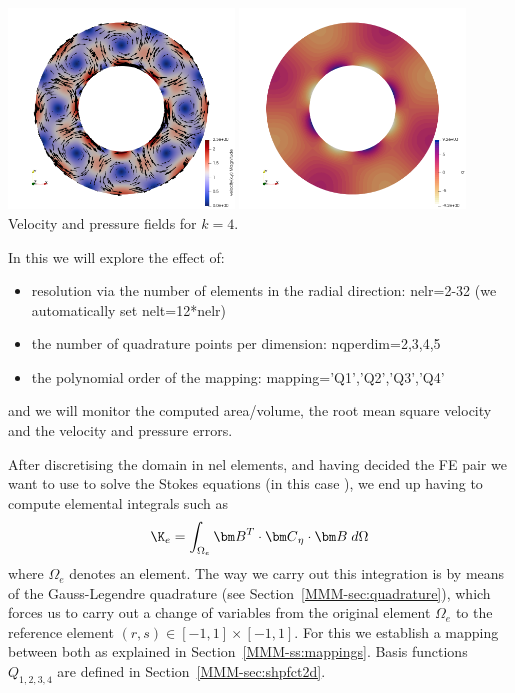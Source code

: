 \begin{center}
\includegraphics[width=6cm]{python_codes/fieldstone_152/images/vel}
\includegraphics[width=6cm]{python_codes/fieldstone_152/images/press}\\
{\captionfont Velocity and pressure fields for $k=4$.}
\end{center}

\noindent In this \stone we will explore the effect of:
\begin{itemize}
\item resolution via the number of elements in the radial direction: {\python nelr=2-32} (we automatically set {\python nelt=12*nelr})
\item the number of quadrature points per dimension: {\python nqperdim=2,3,4,5}
\item the polynomial order of the mapping: {\python mapping='Q1','Q2','Q3','Q4'}
\end{itemize}
and we will monitor the computed area/volume, the root mean square velocity and the velocity and pressure errors.

After discretising the domain in {\python nel} elements, and having decided the FE
pair we want to use to solve the Stokes equations (in this case \QtwoQone), we end up 
having to compute elemental integrals such as 
\[
\K_e = \int_{\Omega_e} {\bm B}^T\cdot {\bm C}_\eta \cdot {\bm B} \; d\Omega
\]
where $\Omega_e$ denotes an element.
The way we carry out this integration is by means of the Gauss-Legendre quadrature
(see Section~\ref{MMM-sec:quadrature}), which 
forces us to carry out a change of variables from the original element $\Omega_e$ 
to the reference element $(r,s) \in [-1,1]\times [-1,1]$. For this we establish a mapping between both 
as explained in Section~\ref{MMM-ss:mappings}.
Basis functions $Q_{1,2,3,4}$ are defined in Section~\ref{MMM-sec:shpfct2d}.

